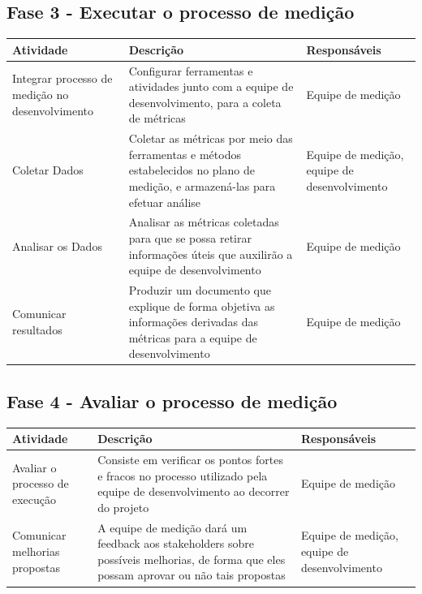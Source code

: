 \subsection{Fase 3 - Executar o processo de medição}

	\begin{tabular}{ |p{4cm}|p{6cm}| p{3cm} |}
	 \hline
	 Atividade 		& 		Descrição & Responsáveis \\
	 \hline
	 	Integrar processo de medição no desenvolvimento & Configurar ferramentas e atividades junto com a equipe de desenvolvimento, para a coleta de métricas &  Equipe de medição \\
	 \hline
	 	Coletar Dados & Coletar as métricas por meio das ferramentas e métodos estabelecidos no plano de medição, e armazená-las para efetuar análise &  Equipe de medição, equipe de desenvolvimento \\
	 \hline
	 	Analisar os Dados & Analisar as métricas coletadas para que se possa retirar informações úteis que auxilirão a equipe de desenvolvimento &  Equipe de medição \\
	 \hline
	 	Comunicar resultados & Produzir um documento que explique de forma objetiva as informações derivadas das métricas para a equipe de desenvolvimento &  Equipe de medição \\
	 \hline
	\end{tabular}

\subsection{Fase 4 - Avaliar o processo de medição}

	\begin{tabular}{ |p{4cm}|p{6cm}| p{3cm} |}

	 \hline
	 Atividade 		& 		Descrição & Responsáveis \\
	 \hline
	 	Avaliar o processo de execução & Consiste em verificar os pontos fortes e fracos no processo utilizado pela equipe de desenvolvimento ao decorrer do projeto &  Equipe de medição \\
	 \hline
	 	Comunicar melhorias propostas & A equipe de medição dará um feedback aos stakeholders sobre possíveis melhorias, de forma que eles possam aprovar ou não tais propostas &  Equipe de medição, equipe de desenvolvimento \\
	 \hline

	\end{tabular}
